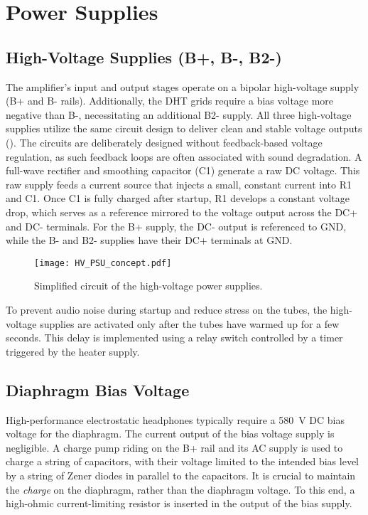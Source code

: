 \section{Power Supplies}

\subsection{High-Voltage Supplies (B+, B-, B2-)}
The amplifier's input and output stages operate on a bipolar high-voltage supply (B+ and B- rails). Additionally, the DHT grids require a bias voltage more negative than B-, necessitating an additional B2- supply. All three high-voltage supplies utilize the same circuit design to deliver clean and stable voltage outputs (). The circuits are deliberately designed without feedback-based voltage regulation, as such feedback loops are often associated with sound degradation. A full-wave rectifier and smoothing capacitor (C1) generate a raw DC voltage. This raw supply feeds a current source that injects a small, constant current into R1 and C1. Once C1 is fully charged after startup, R1 develops a constant voltage drop, which serves as a reference mirrored to the voltage output across the DC+ and DC- terminals. For the B+ supply, the DC- output is referenced to GND, while the B- and B2- supplies have their DC+ terminals at GND.

\begin{figure}
\begin{center}
\texttt{[image: HV\_PSU\_concept.pdf]}
\caption{Simplified circuit of the high-voltage power supplies.}
\end{center}
\end{figure}

To prevent audio noise during startup and reduce stress on the tubes, the high-voltage supplies are activated only after the tubes have warmed up for a few seconds. This delay is implemented using a relay switch controlled by a timer triggered by the heater supply.

\subsection{Diaphragm Bias Voltage}
High-performance electrostatic headphones typically require a \SI{580}{V} DC bias voltage for the diaphragm. The current output of the bias voltage supply is negligible. A charge pump riding on the B+ rail and its AC supply is used to charge a string of capacitors, with their voltage limited to the intended bias level by a string of Zener diodes in parallel to the capacitors. It is crucial to maintain the \emph{charge} on the diaphragm, rather than the diaphragm voltage. To this end, a high-ohmic current-limiting resistor is inserted in the output of the bias supply.

